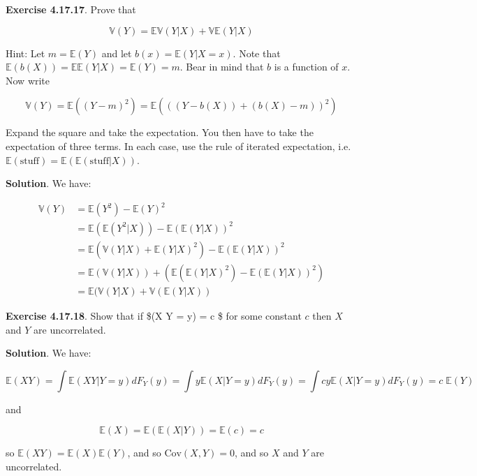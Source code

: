 \textbf{Exercise 4.17.17}. Prove that

\[ \mathbb{V}(Y) = \mathbb{E} \mathbb{V} (Y | X) + \mathbb{V} \mathbb{E} (Y | X) \]

Hint: Let \(m = \mathbb{E}(Y)\) and let
\(b(x) = \mathbb{E}(Y | X = x)\). Note that
\(\mathbb{E}(b(X)) = \mathbb{E} \mathbb{E}(Y | X) = \mathbb{E}(Y) = m\).
Bear in mind that \(b\) is a function of \(x\). Now write

\[\mathbb{V}(Y) = \mathbb{E}((Y - m)^2) = \mathbb{E}(((Y - b(X)) + (b(X) - m))^2)\]

Expand the square and take the expectation. You then have to take the
expectation of three terms. In each case, use the rule of iterated
expectation,
i.e.~\(\mathbb{E}(\text{stuff}) = \mathbb{E}(\mathbb{E}(\text{stuff} | X))\).

\textbf{Solution}. We have:

\begin{align}
\mathbb{V}(Y) &= \mathbb{E}(Y^2) - \mathbb{E}(Y)^2 \\
&= \mathbb{E}(\mathbb{E}(Y^2 | X)) - \mathbb{E}(\mathbb{E}(Y | X))^2 \\
&= \mathbb{E}\left( \mathbb{V}(Y | X) + \mathbb{E}(Y | X)^2 \right) - \mathbb{E}(\mathbb{E}(Y | X))^2 \\
&= \mathbb{E}(\mathbb{V}(Y | X)) + \left( \mathbb{E}(\mathbb{E}(Y | X)^2) - \mathbb{E}(\mathbb{E}(Y | X))^2 \right) \\
&= \mathbb{E} (\mathbb{V}(Y | X) + \mathbb{V}(\mathbb{E}(Y | X))
\end{align}

\textbf{Exercise 4.17.18}. Show that if \$(X \textbar{} Y = y)
= c \$ for some constant \(c\) then \(X\) and \(Y\) are uncorrelated.

\textbf{Solution}. We have:

\[ \mathbb{E}(XY) = \int \mathbb{E}(XY | Y = y) dF_Y(y) = \int y \mathbb{E}(X | Y = y) dF_Y(y) = \int cy \mathbb{E}(X | Y = y) dF_Y(y) = c \; \mathbb{E}(Y)\]

and

\[ \mathbb{E}(X) = \mathbb{E}(\mathbb{E}(X | Y)) = \mathbb{E}(c) = c \]

so \(\mathbb{E}(XY) = \mathbb{E}(X) \mathbb{E}(Y)\), and so
\(\text{Cov}(X, Y) = 0\), and so \(X\) and \(Y\) are uncorrelated.

